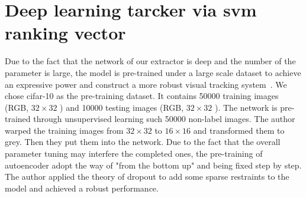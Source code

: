 \documentclass[10pt,twocolumn,letterpaper]{article}
\begin{document}
\section{Deep learning tarcker via svm ranking vector }
Due to the fact that the network of our extractor is deep and the number of the parameter is large, the model is pre-trained under a large scale dataset to achieve an expressive power and construct a more robust visual tracking system~\cite{Ouyang2014Joint}. We chose cifar-10 as the pre-training dataset. It contains 50000 training images (RGB, $32\times32$ ) and 10000 testing images (RGB, $32\times32$ ). The network is pre-trained through unsupervised learning such 50000 non-label images.
The author warped the  training  images  from  $32\times32$  to  $16\times16$ and transformed them to grey. Then they put them into the network. Due to the fact that the overall parameter tuning may interfere the completed ones, the pre-training of autoencoder adopt the way of "from the bottom up" and being fixed step by step. The author applied the theory of dropout to add some sparse restraints to the model and achieved a robust performance.
{\small


}
\end{document}
